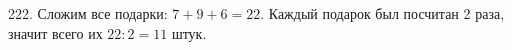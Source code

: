 222. Сложим все подарки: $7+9+6=22.$ Каждый подарок был посчитан 2 раза, значит всего их $22:2=11$ штук.\\
